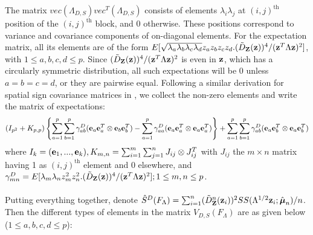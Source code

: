 \documentclass[fleqn,11pt]{article}
\begin{document}
The matrix $vec(\Lambda_{D,S}) vec^T(\Lambda_{D,S})$ consists of elements $\lambda_i\lambda_j$ at $(i,j)^\text{th}$ position of the $(i,j)^\text{th}$ block, and 0 otherwise. These positions correspond to variance and covariance components of on-diagonal elements. For the expectation matrix, all its elements are of the form $E[\sqrt{\lambda_a \lambda_b \lambda_c \lambda_d} z_a z_b z_c z_d . (\tilde D_{\mathbf{Z}} ({\bf{z}}))^4 / ({\bf{z}}^T \Lambda {\bf{z}})^2]$, with $1 \leq a,b,c,d \leq p$. Since $(\tilde D_{\mathbf{Z}} ({\bf{z}}))^4 / ({\bf{z}}^T \Lambda {\bf{z}})^2$ is even in ${\bf{z}}$, which has a circularly symmetric distribution, all such expectations will be 0 unless $a=b=c=d$, or they are pairwise equal. Following a similar derivation for spatial sign covariance matrices in \cite{magyar14}, we collect the non-zero elements and write the matrix of expectations:
%
$$ (I_{p^2} + K_{p,p}) \left\{ \sum_{a=1}^p \sum_{b=1}^p \gamma^D_{ab} ({\bf{e}}_a {\bf{e}}_a^T \otimes  {\bf{e}}_b {\bf{e}}_b^T) - \sum_{a=1}^p \gamma^D_{aa} ({\bf{e}}_a {\bf{e}}_a^T \otimes  {\bf{e}}_a {\bf{e}}_a^T) \right\} + \sum_{a=1}^p \sum_{b=1}^p \gamma^D_{ab} ({\bf{e}}_a {\bf{e}}_b^T \otimes  {\bf{e}}_a {\bf{e}}_b^T) $$
%
where $I_k = ({\bf{e}}_1,...,{\bf{e}}_k), K_{m,n} = \sum_{i=1}^m \sum_{j=1}^n J_{ij} \otimes J_{ij}^T$ with $J_{ij}$ the $m \times n$ matrix having 1 as $(i,j)^\text{th}$ element and 0 elsewhere, and $\gamma^D_{mn} = E[ \lambda_m \lambda_n z_m^2 z_n ^2 . (\tilde D_{\mathbf{Z}} ({\bf{z}}))^4 / ({\bf{z}}^T \Lambda {\bf{z}})^2]; 1 \leq m,n \leq p$.

\paragraph{}Putting everything together, denote $\hat S^D(F_\Lambda) = \sum_{i=1}^n (\tilde D^n_{\mathbf{Z}} ({\bf{z}}_i))^2 SS(\Lambda^{1/2}{\bf{z}}_i; \hat {{\boldsymbol{\mu}}}_n)/n $. Then the different types of elements in the matrix $V_{D,S}(F_\Lambda)$ are as given below ($1 \leq a,b,c,d \leq p$):
\end{document}
